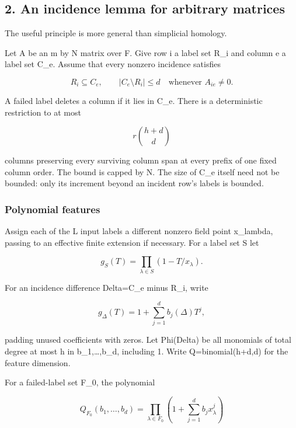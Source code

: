 \hypertarget{af-3f6acd6e5b-an-incidence-lemma-for-arbitrary-matrices}{%
\subsection{2. An incidence lemma for arbitrary matrices}\label{af-3f6acd6e5b-an-incidence-lemma-for-arbitrary-matrices}}

The useful principle is more general than simplicial homology.

Let A be an m by N matrix over F. Give row i a label set R\_i and column e a label set C\_e. Assume that every nonzero incidence satisfies

\[
R_i\subseteq C_e,
       \qquad |C_e\setminus R_i|\le d
       \quad\text{whenever } A_{ie}\ne0.
 \tag{T5}
\]

A failed label deletes a column if it lies in C\_e. There is a deterministic restriction to at most

\[
r\binom{h+d}{d}
 \tag{T6}
\]

columns preserving every surviving column span at every prefix of one fixed column order. The bound is capped by N. The size of C\_e itself need not be bounded: only its increment beyond an incident row's labels is bounded.

\hypertarget{af-3f6acd6e5b-polynomial-features}{%
\subsubsection{Polynomial features}\label{af-3f6acd6e5b-polynomial-features}}

Assign each of the L input labels a different nonzero field point x\_lambda, passing to an effective finite extension if necessary. For a label set S let

\[
g_S(T)=\prod_{\lambda\in S}(1-T/x_\lambda).
 \tag{T7}
\]

For an incidence difference Delta=C\_e minus R\_i, write

\[
g_\Delta(T)=1+\sum_{j=1}^d b_j(\Delta)T^j,
 \tag{T8}
\]

padding unused coefficients with zeros. Let Phi(Delta) be all monomials of total degree at most h in b\_1,\ldots,b\_d, including 1. Write Q=binomial(h+d,d) for the feature dimension.

For a failed-label set F\_0, the polynomial

\[
Q_{F_0}(b_1,\ldots,b_d)
   =\prod_{\lambda\in F_0}
       \left(1+\sum_{j=1}^d b_j x_\lambda^j\right)
 \tag{T9}
\]

